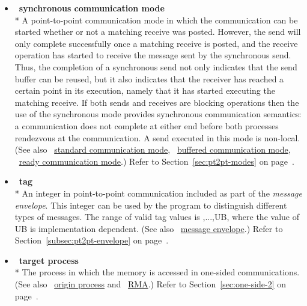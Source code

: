 \begin{itemize}
\label{glossary:synchronous_communication_mode}
\item  ~\hypertarget{glossary:synchronous_communication_mode}{\textbf{synchronous communication mode}} \\*
A point-to-point communication mode in which the
communication can be started whether or
not a matching receive was posted.  However, the send will only complete 
successfully once a matching receive is posted, and the
receive operation has started to receive the message sent by the
synchronous send.
Thus, the completion of a synchronous send not only indicates that the
send buffer can be reused, but 
it also indicates that the receiver has
reached a certain point in its execution, namely that it has started
executing the matching receive.  If both sends and receives are
blocking operations then the use of the synchronous mode provides
synchronous communication semantics: a communication does not complete
at either end before both processes rendezvous at the
communication.  A send executed in this mode is non-local.
(See also ~\hyperlink{glossary:standard_communication_mode}{standard communication mode}, 
~\hyperlink{glossary:buffered_communication_mode}{buffered communication mode},
~\hyperlink{glossary:ready communication_mode}{ready communication mode}.)
Refer to Section~\ref{sec:pt2pt-modes} on page~\pageref{sec:pt2pt-modes}.

\label{glossary:tag}
\item  ~\hypertarget{glossary:tag}{\textbf{tag}} \\*
An integer in point-to-point communication included as part of the \emph{message envelope}.
This integer can be used by the program to distinguish different types of
messages.
The range of valid tag values is {,...,UB}, where the value of {\sf UB} is
implementation dependent.
(See also ~\hyperlink{glossary:message_envelope}{message envelope}.)
Refer to Section~\ref{subsec:pt2pt-envelope} on page~\pageref{subsec:pt2pt-envelope}.

\label{glossary:target_process}
\item  ~\hypertarget{glossary:target_process}{\textbf{target process}} \\*
The process in which the memory is accessed in one-sided communications.
(See also ~\hyperlink{glossary:origin_process}{origin process} and 
~\hyperlink{glossary:RMA}{RMA}.)
Refer to Section~\ref{sec:one-side-2} on page~\pageref{sec:one-side-2}.


\end{itemize}
